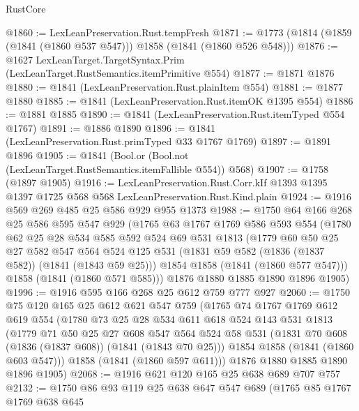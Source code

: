 \begin{lexlean}{RustCore}
\begin{coremodule}
@1860 := LexLeanPreservation.Rust.tempFresh
@1871 := @1773 (@1814 (@1859 (@1841 (@1860 @537 @547))) @1858 (@1841 (@1860 @526 @548)))
@1876 := @1627 LexLeanTarget.TargetSyntax.Prim (LexLeanTarget.RustSemantics.itemPrimitive @554)
@1877 := @1871 @1876
@1880 := @1841 (LexLeanPreservation.Rust.plainItem @554)
@1881 := @1877 @1880
@1885 := @1841 (LexLeanPreservation.Rust.itemOK @1395 @554)
@1886 := @1881 @1885
@1890 := @1841 (LexLeanPreservation.Rust.itemTyped @554 @1767)
@1891 := @1886 @1890
@1896 := @1841 (LexLeanPreservation.Rust.primTyped @33 @1767 @1769)
@1897 := @1891 @1896
@1905 := @1841 (Bool.or (Bool.not (LexLeanTarget.RustSemantics.itemFallible @554)) @568)
@1907 := @1758 (@1897 @1905)
@1916 := LexLeanPreservation.Rust.Corr.kIf
    @1393
    @1395
    @1397
    @1725
    @568
    @568
    LexLeanPreservation.Rust.Kind.plain
@1924 := @1916 @569 @269 @485 @25 @586 @929 @955 @1373
@1988 := @1750
    @64
    @166
    @268
    @25
    @586
    @595
    @547
    @929
    (@1765
      @63
      @1767
      @1769
      @586
      @593
      @554
      (@1780
        @62
        @25
        @28
        @534
        @585
        @592
        @524
        @69
        @531
        @1813
        (@1779
          @60
          @50
          @25
          @27
          @582
          @547
          @564
          @524
          @125
          @531
          (@1831 @59 @582 (@1836 (@1837 @582)) (@1841 (@1843 @59 @25)))
          @1854
          @1858
          (@1841 (@1860 @577 @547)))
        @1858
        (@1841 (@1860 @571 @585)))
      @1876
      @1880
      @1885
      @1890
      @1896
      @1905)
@1996 := @1916 @595 @166 @268 @25 @612 @759 @777 @927
@2060 := @1750
    @75
    @120
    @165
    @25
    @612
    @621
    @547
    @759
    (@1765
      @74
      @1767
      @1769
      @612
      @619
      @554
      (@1780
        @73
        @25
        @28
        @534
        @611
        @618
        @524
        @143
        @531
        @1813
        (@1779
          @71
          @50
          @25
          @27
          @608
          @547
          @564
          @524
          @58
          @531
          (@1831 @70 @608 (@1836 (@1837 @608)) (@1841 (@1843 @70 @25)))
          @1854
          @1858
          (@1841 (@1860 @603 @547)))
        @1858
        (@1841 (@1860 @597 @611)))
      @1876
      @1880
      @1885
      @1890
      @1896
      @1905)
@2068 := @1916 @621 @120 @165 @25 @638 @689 @707 @757
@2132 := @1750
    @86
    @93
    @119
    @25
    @638
    @647
    @547
    @689
    (@1765
      @85
      @1767
      @1769
      @638
      @645

\end{coremodule}
\end{lexlean}
